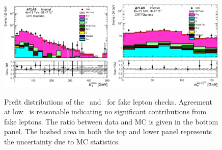 \begin{figure}[htbp]
\begin{center}
\includegraphics[width=0.49\textwidth]{figures/ttGamma/Met_CRTTGamma_withRatio_log.eps}
\includegraphics[width=0.49\textwidth]{figures/ttGamma/MtMetLep_CRTTGamma_withRatio_log.eps}
\caption{\label{fig:ttVFakeLepCheck} Prefit distributions of the \met\ and \mtlepmet\ for fake lepton checks. Agreement at low \mtlepmet\ is reasonable indicating no significant contributions from fake leptons. The ratio between data and MC is given in the bottom panel. The hashed area in both the top and lower panel represents the uncertainty due to MC statistics.}
\end{center}
\end{figure}

